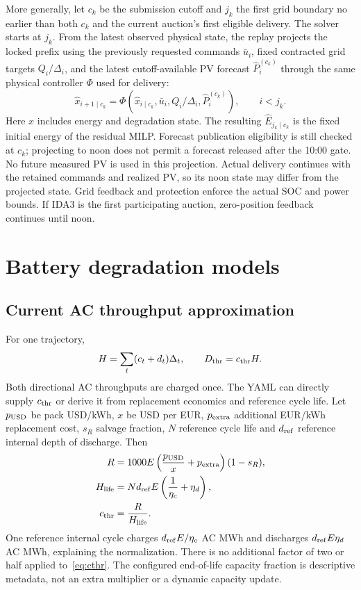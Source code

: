 \documentclass[11pt,a4paper]{article}
\begin{document}
More generally, let $c_k$ be the submission cutoff and $j_k$ the first grid
boundary no earlier than both $c_k$ and the current auction's first eligible
delivery. The solver starts at $j_k$. From the latest observed physical state,
the replay projects the locked prefix using the previously requested commands
$\bar u_i$, fixed contracted grid targets $Q_i/\Delta_i$, and the latest
cutoff-available PV forecast $\widehat P^{(c_k)}_i$ through the same physical
controller $\Phi$ used for delivery:
\begin{equation}
 \widehat x_{i+1\mid c_k}
 =\Phi\!\left(\widehat x_{i\mid c_k},\bar u_i,
              Q_i/\Delta_i,\widehat P^{(c_k)}_i\right),\qquad i<j_k.
\end{equation}
Here $x$ includes energy and degradation state. The resulting
$\widehat E_{j_k\mid c_k}$ is the fixed initial energy of the residual MILP.
Forecast publication eligibility is still checked at $c_k$; projecting to noon
does not permit a forecast released after the 10:00 gate. No future measured PV
is used in this projection. Actual delivery continues with the retained commands
and realized PV, so its noon state may differ from the projected state. Grid
feedback and protection enforce the actual SOC and power bounds. If IDA3 is the
first participating auction, zero-position feedback continues until noon.

\section{Battery degradation models}

\subsection{Current AC throughput approximation}
For one trajectory,
\begin{equation}
 H=\sum_t(c_t+d_t)\Delta_t,\qquad D_{\rm thr}=c_{\rm thr}H.
\end{equation}
Both directional AC throughputs are charged once. The YAML can directly supply
$c_{\rm thr}$ or derive it from replacement economics and reference cycle life.
Let $p_{\rm USD}$ be pack USD/kWh, $x$ be USD per EUR, $p_{\rm extra}$ additional
EUR/kWh replacement cost, $s_R$ salvage fraction, $N$ reference cycle life and
$d_{\rm ref}$ reference internal depth of discharge. Then
\begin{align}
 R&=1000E\left(\frac{p_{\rm USD}}{x}+p_{\rm extra}\right)(1-s_R),\label{eq:replacement}\\
 H_{\rm life}&=N d_{\rm ref}E\left(\frac{1}{\eta_c}+\eta_d\right),\\
 c_{\rm thr}&=\frac{R}{H_{\rm life}}.\label{eq:cthr}
\end{align}
One reference internal cycle charges $d_{\rm ref}E/\eta_c$ AC MWh and discharges
$d_{\rm ref}E\eta_d$ AC MWh, explaining the normalization. There is no additional
factor of two or half applied to~\eqref{eq:cthr}. The configured end-of-life
capacity fraction is descriptive metadata, not an extra multiplier or a dynamic
capacity update.
\end{document}
